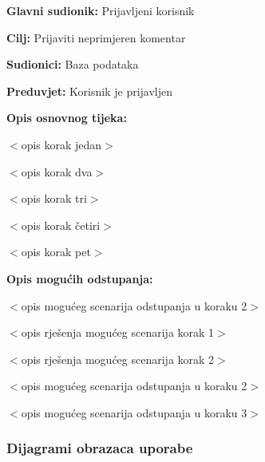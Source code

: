 \noindent {}
\begin{packed_item}

\item \textbf{Glavni sudionik:} Prijavljeni korisnik
\item  \textbf{Cilj:} Prijaviti neprimjeren komentar
\item  \textbf{Sudionici:} Baza podataka
\item  \textbf{Preduvjet:} Korisnik je prijavljen
\item  \textbf{Opis osnovnog tijeka:}

\item[] \begin{packed_enum}

    \item $<$opis korak jedan$>$
    \item $<$opis korak dva$>$
    \item $<$opis korak tri$>$
    \item $<$opis korak četiri$>$
    \item $<$opis korak pet$>$

\end{packed_enum}

\item  \textbf{Opis mogućih odstupanja:}

\item[] \begin{packed_item}

    \item[2.a] $<$opis mogućeg scenarija odstupanja u koraku 2$>$
    \item[] \begin{packed_enum}

        \item $<$opis rješenja mogućeg scenarija korak 1$>$
        \item $<$opis rješenja mogućeg scenarija korak 2$>$

    \end{packed_enum}

\item[2.b] $<$opis mogućeg scenarija odstupanja u koraku 2$>$
\item[3.a] $<$opis mogućeg scenarija odstupanja  u koraku 3$>$

\end{packed_item}
\end{packed_item}

\subsubsection{Dijagrami obrazaca uporabe}

